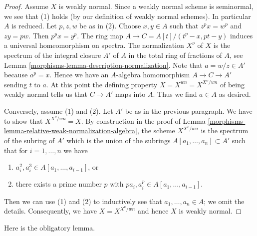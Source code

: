 \begin{proof}

Assume $X$ is weakly normal. Since a weakly normal scheme is seminormal,
we see that (1) holds (by our definition of weakly normal schemes).
In particular $A$ is reduced. Let $p, z, w$ be as in (2).
Choose $x, y \in A$ such that $z^p x = w^p$ and $zy = pw$.
Then $p^p x = y^p$. The ring map
$A \to C = A[t]/(t^p - x, pt - y)$ induces a universal homeomorphism
on spectra. The normalization $X^\nu$ of $X$
is the spectrum of the integral closure $A'$
of $A$ in the total ring of fractions of $A$, see
Lemma \ref{morphisms-lemma-description-normalization}.
Note that $a = w/z \in A'$ because $a^p = x$.
Hence we have an $A$-algebra homomorphism $A \to C \to A'$
sending $t$ to $a$.
At this point the defining property $X = X^{wn} = X^{X^\nu/wn}$
of being weakly normal tells us that $C \to A'$ maps into $A$.
Thus we find $a \in A$ as desired.

\medskip\noindent
Conversely, assume (1) and (2). Let $A'$ be as in the previous paragraph.
We have to show that $X^{X^\nu/wn} = X$. By construction in the proof
of Lemma \ref{morphisms-lemma-relative-weak-normalization-algebra}, the scheme
$X^{X^\nu/wn}$ is the spectrum of the subring of $A'$
which is the union of the subrings $A[a_1, \ldots, a_n] \subset A'$
such that for $i = 1, \ldots, n$ we have
\begin{enumerate}
\item[(a)] $a_i^2, a_i^3 \in A[a_1, \ldots, a_{i - 1}]$, or
\item[(b)] there exists a prime number $p$ with
$pa_i, a_i^p \in A[a_1, \ldots, a_{i - 1}]$.
\end{enumerate}
Then we can use (1) and (2) to inductively see that $a_1, \ldots, a_n \in A$;
we omit the details. Consequently, we have $X = X^{X^\nu/wn}$ and hence
$X$ is weakly normal.
\end{proof}

Here is the obligatory lemma.

